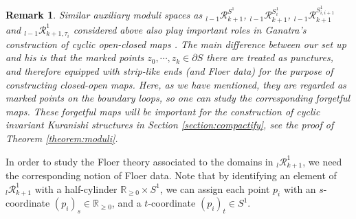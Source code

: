 \documentclass[a4paper]{article}
\newtheorem{remark}[theorem]{Remark}
\numberwithin{equation}{section}
\begin{document}
\begin{remark}
Similar auxiliary moduli spaces as ${}_{l-1}\mathcal{R}_{k+1}^{S^1}$, ${}_{l-1}\mathcal{R}_{k+1}^{S_i^1}$,  ${}_{l-1}\mathcal{R}_{k+1}^{S_{i,i+1}^1}$ and ${}_{l-1}\mathcal{R}_{k+1,\tau_i}^1$ considered above also play important roles in Ganatra's construction of cyclic open-closed maps \cite{sg1}. The main difference between our set up and his is that the marked points $z_0,\cdots,z_k\in\partial S$ there are treated as punctures, and therefore equipped with strip-like ends (and Floer data) for the purpose of constructing closed-open maps. Here, as we have mentioned, they are regarded as marked points on the boundary loops, so one can study the corresponding forgetful maps. These forgetful maps will be important for the construction of cyclic invariant Kuranishi structures in Section \ref{section:compactify}, see the proof of Theorem \ref{theorem:moduli}.
\end{remark}
\bigskip

In order to study the Floer theory associated to the domains in ${}_l\mathcal{R}_{k+1}^1$, we need the corresponding notion of Floer data. Note that by identifying an element of ${}_l\mathcal{R}_{k+1}^1$ with a half-cylinder $\mathbb{R}_{\geq0}\times S^1$, we can assign each point $p_i$ with an $s$-coordinate $(p_i)_s\in\mathbb{R}_{\geq0}$, and a $t$-coordinate $(p_i)_t\in S^1$.
\end{document}
